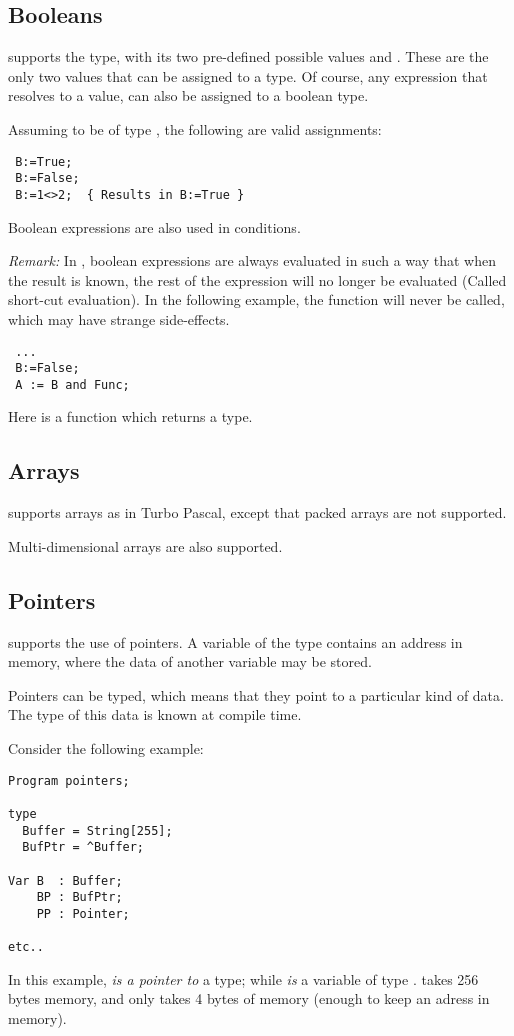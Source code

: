\documentclass{report}
\begin{document}
\subsection{Booleans}
\fpc supports the  type, with its two pre-defined possible
values  and . These are the only two values that can be
assigned to a  type. Of course, any expression that resolves
to a  value, can also be assigned to a boolean type.

Assuming  to be of type , the following are valid
assignments:
\begin{verbatim}
 B:=True;
 B:=False;
 B:=1<>2;  { Results in B:=True }
\end{verbatim}
Boolean expressions are also used in conditions.

{\em Remark:} In \fpc, boolean expressions are always evaluated in such a
way that when the result is known, the rest of the expression will no longer
be evaluated (Called short-cut evaluation). In the following example, the function  will never
be called, which may have strange side-effects.
\begin{verbatim}
 ...
 B:=False;
 A := B and Func;
\end{verbatim} 
Here  is a function which returns a  type.

\subsection{Arrays}
\fpc supports arrays as in Turbo Pascal, except that packed arrays are not
supported. 

Multi-dimensional arrays are also supported.

\subsection{Pointers}
\fpc supports the use of pointers. A variable of the type 
contains an address in memory, where the data of another variable may be 
stored.

Pointers can be typed, which means that they point to a particular kind of
data. The type of this data is known at compile time.

Consider the following example:
\begin{CodEx}
\begin{verbatim}
Program pointers;

type 
  Buffer = String[255];
  BufPtr = ^Buffer;

Var B  : Buffer;
    BP : BufPtr;
    PP : Pointer;

etc..
\end{verbatim}
\end{CodEx}
In this example,  {\em is a pointer to} a  type; while 
{\em is} a variable of type .  takes 256 bytes memory,
and  only takes 4 bytes of memory (enough to keep an adress in
memory).
\end{document}
